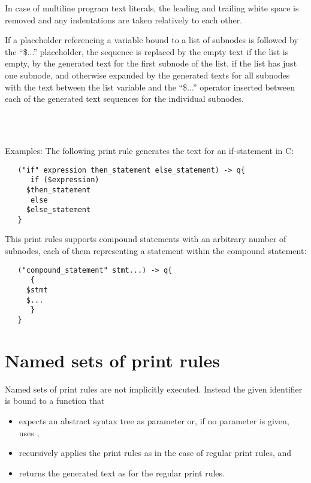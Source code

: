 In case of multiline program text literals, the leading and trailing
white space is removed and any indentations are taken relatively to
each other.

If a placeholder referencing a variable bound to a list of 
subnodes is followed by the ``\$...'' placeholder, the
sequence is replaced by the empty text if the list is empty,
by the generated text for the first subnode of the list, if
the list has just one subnode, and otherwise expanded
by the generated texts for all subnodes with the text between
the list variable and the ``\$...'' operator inserted between
each of the generated text sequences for the individual subnodes.

\begin{grammar}
      \produces \lextoken{\$}  \\
      \produces \lextoken{\$}
	 \lextoken{\{}  \lextoken{\}} \\
      \produces {}
\end{grammar}

\noindent
Examples: The following print rule generates the text for an
if-statement in C:

\begin{lstlisting}
   ("if" expression then_statement else_statement) -> q{
      if ($expression)
	 $then_statement
      else
	 $else_statement
   }
\end{lstlisting}

\noindent
This print rules supports compound statements with an arbitrary
number of subnodes, each of them representing a statement within
the compound statement:

\begin{lstlisting}
   ("compound_statement" stmt...) -> q{
      {
	 $stmt
	 $...
      }
   }
\end{lstlisting}

\section{Named sets of print rules}\label{named-print}

Named sets of print rules are not implicitly executed. Instead the
given identifier is bound to a function that

\begin{itemize}
   \item expects an abstract syntax tree as parameter or,
      if no parameter is given, uses ,
   \item recursively applies the print rules as in the
      case of regular print rules, and
   \item returns the generated text as  for the
      regular print rules.
\end{itemize}

